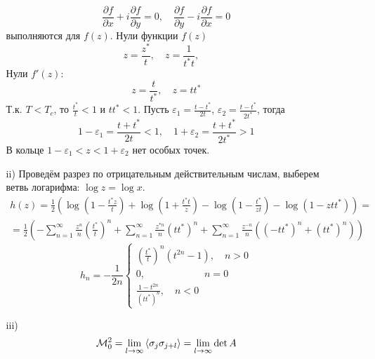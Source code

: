 \documentclass[12pt]{article}
\theoremstyle{definition}
\begin{document}
\begin{enumerate}
\begin{itemize}
\begin{equation}
            \frac{\partial f}{\partial x}+i\frac{\partial f}{\partial y}=0,\quad\frac{\partial f}{\partial y}-i\frac{\partial f}{\partial x}=0
        \end{equation}
        выполняются для $f(z)$. Нули функции $f(z)$
        \begin{equation}
            z=\frac{z^*}{t},\quad z=\frac{1}{t^*t},\quad
        \end{equation}
        Нули $f'(z)$:
        \begin{equation}
            z=\frac{t}{t^*},\quad z=tt^*
        \end{equation}
        Т.к. $T<T_c$, то $\frac{t^*}{t}<1$ и $tt^*<1$. Пусть $\varepsilon_1=\frac{t-t^*}{2t}$, $\varepsilon_2=\frac{t-t^*}{2t^*}$, тогда
        \begin{equation}
            1-\varepsilon_1=\frac{t+t^*}{2t}<1,\quad 1+\varepsilon_2=\frac{t+t^*}{2t^*}>1
        \end{equation}
        В кольце $1-\varepsilon_1<z<1+\varepsilon_2$ нет особых точек.
        \item[ii)] Проведём разрез по отрицательным действительным числам, выберем ветвь логарифма: $\log z=\log x$.
        \begin{multline}
            h(z)=\frac{1}{2}\left(\log\left(1-\frac{t^*z}{t}\right)+\log\left(1+\frac{t^*t}{z}\right)-\log\left(1-\frac{t^*}{zt}\right)-\log(1-ztt^*)\right)=\\=\frac{1}{2}\left(-\sum\limits_{n=1}^\infty\frac{z^n}{n}\left(\frac{t^*}{t}\right)^n+\sum\limits_{n=1}^\infty\frac{z^{*n}}{n}(tt^*)^n+\sum\limits_{n=1}^\infty\frac{z^{-n}}{n}((-tt^*)^n+(tt^*)^n)\right)
        \end{multline}
        \begin{equation}
            \boxed{h_n=-\frac{1}{2n}\begin{cases}
                \left(\frac{t^*}{t}\right)^n(t^{2n}-1),\quad n>0\\
                0,\quad\quad\quad\quad\quad\quad n=0\\
                \frac{1-t^{2n}}{(tt^*)^n},\quad n<0
            \end{cases}}
        \end{equation}
        \item[iii)]
        \begin{equation}
            \mathcal{M}_0^2=\lim\limits_{l\rightarrow\infty}\braket{\sigma_j\sigma_{j+l}}=\lim\limits_{l\rightarrow\infty}\det A
        \end{equation}

\end{itemize}
\end{enumerate}
\end{document}

